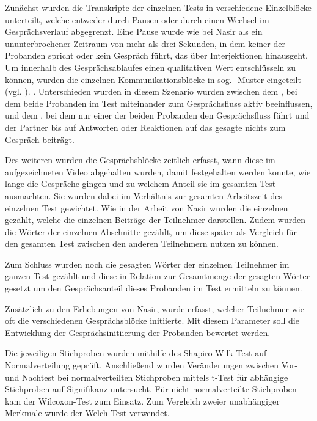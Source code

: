 Zunächst wurden die Transkripte der einzelnen Tests in verschiedene Einzelblöcke unterteilt, welche entweder durch Pausen oder durch einen Wechsel im Gesprächsverlauf abgegrenzt. Eine Pause wurde wie bei Nasir als ein ununterbrochener Zeitraum von mehr als drei Sekunden, in dem keiner der Probanden spricht oder kein Gespräch führt, das über Interjektionen hinausgeht. Um innerhalb des Gesprächsablaufes einen qualitativen Wert entschlüsseln zu können, wurden die einzelnen Kommunikationsblöcke in sog. -Muster eingeteilt (vgl. \cite{edelsky_whos_1981}).  \cite[S. 135, eigene Übersetzung]{nasir_effect_2015}. Unterschieden wurden in diesem Szenario wurden zwischen dem , bei dem beide Probanden im Test miteinander zum Gesprächsfluss aktiv beeinflussen, und dem , bei dem nur einer der beiden Probanden den Gesprächsfluss führt und der Partner bis auf Antworten oder Reaktionen auf das gesagte nichts zum Gespräch beiträgt.

Des weiteren wurden die Gesprächsblöcke zeitlich erfasst, wann diese im aufgezeichneten Video abgehalten wurden, damit festgehalten werden konnte, wie lange die Gespräche gingen und zu welchem Anteil sie im gesamten Test ausmachten. Sie wurden dabei im Verhältnis zur gesamten Arbeitszeit des einzelnen Test gewichtet. Wie in der Arbeit von Nasir wurden die einzelnen  gezählt, welche die einzelnen Beiträge der Teilnehmer darstellen. Zudem wurden die Wörter der einzelnen Abschnitte gezählt, um diese später als Vergleich für den gesamten Test zwischen den anderen Teilnehmern nutzen zu können. 

Zum Schluss wurden noch die gesagten Wörter der einzelnen Teilnehmer im ganzen Test gezählt und diese in Relation zur Gesamtmenge der gesagten Wörter gesetzt um den Gesprächsanteil dieses Probanden im Test ermitteln zu können.

Zusätzlich zu den Erhebungen von Nasir, wurde erfasst, welcher Teilnehmer wie oft die verschiedenen Gesprächsblöcke initiierte. Mit diesem Parameter soll die Entwicklung der Gesprächsinitiierung der Probanden bewertet werden.

Die jeweiligen Stichproben wurden mithilfe des Shapiro-Wilk-Test auf Normalverteilung geprüft. Anschließend wurden Veränderungen zwischen Vor- und Nachtest bei normalverteilten Stichproben mittels t-Test für abhängige Stichproben auf Signifikanz untersucht. Für nicht normalverteilte Stichproben kam der Wilcoxon-Test zum Einsatz. Zum Vergleich zweier unabhängiger Merkmale wurde der Welch-Test verwendet.

